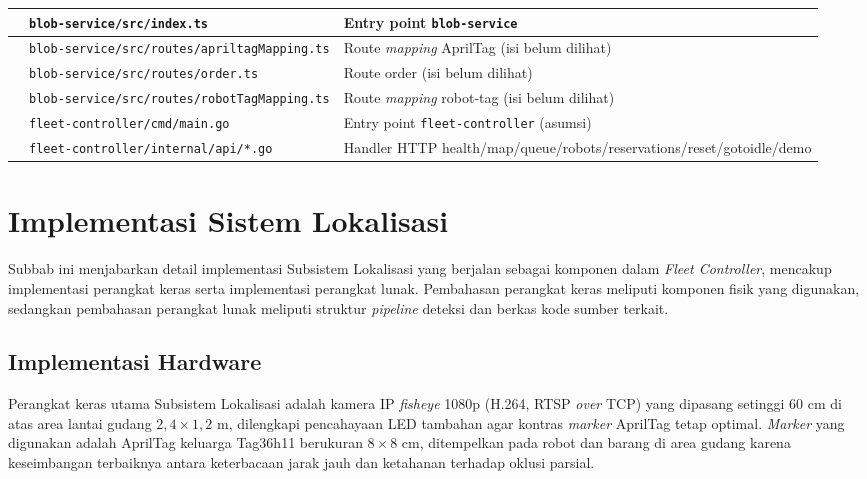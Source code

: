 \begin{xltabular}{\textwidth}{ | >{\raggedright\arraybackslash}p{1.5cm} | >{\raggedright\arraybackslash}p{6.5cm} | >{\raggedright\arraybackslash}X | }
     & \texttt{blob-service/\allowbreak src/\allowbreak index.ts} & Entry point \texttt{blob-service} \\
     & \texttt{blob-service/\allowbreak src/\allowbreak routes/\allowbreak apriltagMapping.ts} & Route \textit{mapping} AprilTag (isi belum dilihat) \\
     & \texttt{blob-service/\allowbreak src/\allowbreak routes/\allowbreak order.ts} & Route order (isi belum dilihat) \\
     & \texttt{blob-service/\allowbreak src/\allowbreak routes/\allowbreak robotTagMapping.ts} & Route \textit{mapping} robot-tag (isi belum dilihat) \\
     & \texttt{fleet-controller/\allowbreak cmd/\allowbreak main.go} & Entry point \texttt{fleet-controller} (asumsi) \\
     & \texttt{fleet-controller/\allowbreak internal/\allowbreak api/*.go} & Handler HTTP health/\allowbreak map/\allowbreak queue/\allowbreak robots/\allowbreak reservations/\allowbreak reset/\allowbreak gotoidle/\allowbreak demo \\
    \hline
\end{xltabular}

\section{Implementasi Sistem Lokalisasi}
Subbab ini menjabarkan detail implementasi Subsistem Lokalisasi yang berjalan sebagai komponen dalam \textit{Fleet Controller}, mencakup implementasi perangkat keras serta implementasi perangkat lunak. Pembahasan perangkat keras meliputi komponen fisik yang digunakan, sedangkan pembahasan perangkat lunak meliputi struktur \textit{pipeline} deteksi dan berkas kode sumber terkait.

\subsection{Implementasi Hardware}
Perangkat keras utama Subsistem Lokalisasi adalah kamera IP \textit{fisheye} 1080p (H.264, RTSP \textit{over} TCP) yang dipasang setinggi 60 cm di atas area lantai gudang $2,4 \times 1,2$ m, dilengkapi pencahayaan LED tambahan agar kontras \textit{marker} AprilTag tetap optimal. \textit{Marker} yang digunakan adalah AprilTag keluarga Tag36h11 berukuran $8 \times 8$ cm, ditempelkan pada robot dan barang di area gudang karena keseimbangan terbaiknya antara keterbacaan jarak jauh dan ketahanan terhadap oklusi parsial.

